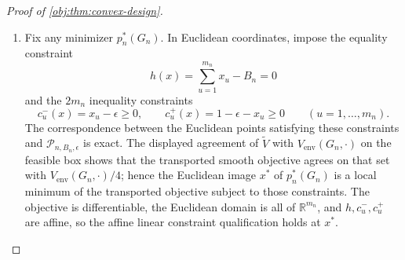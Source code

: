 \documentclass[11pt]{article}
\begin{document}
\begin{proof}[Proof of \cref{obj:thm:convex-design}]
\begin{enumerate}
For a feasible \(p\), a coordinate \(k\), and a shared neighborhood \(S_{ij}\), differentiation along the \(k\)-th coordinate line gives
\[
\left.\frac{d}{dt}\right|_{t=0}
 \prod_{\ell\in S_{ij}}
 \bigl(p_\ell+\mathbf 1\{\ell=k\}t\bigr)^{-1}
=
\begin{cases}
-\left(\prod_{\ell\in S_{ij}}p_\ell^{-1}\right)p_k^{-1},
   &k\in S_{ij},\\
0,&k\notin S_{ij},
\end{cases}
\]
and
\[
\left.\frac{d}{dt}\right|_{t=0}
 \prod_{\ell\in S_{ij}}
 \bigl(1-p_\ell-\mathbf 1\{\ell=k\}t\bigr)^{-1}
=
\begin{cases}
\left(\prod_{\ell\in S_{ij}}(1-p_\ell)^{-1}\right)(1-p_k)^{-1},
   &k\in S_{ij},\\
0,&k\notin S_{ij}.
\end{cases}
\]
When \(k\notin S_{ij}\) the product does not depend on \(t\), and when \(k\in S_{ij}\) only the factor indexed by \(k\) varies, contributing \(\frac{d}{dt}(p_k+t)^{-1}|_{t=0}=-p_k^{-2}\) and \(\frac{d}{dt}(1-p_k-t)^{-1}|_{t=0}=(1-p_k)^{-2}\), respectively.  Subtracting the constant \(1\) leaves these derivatives unchanged, so the same formulas hold for the treated and control overlap loads, including the case \(S_{ij}=\varnothing\), where both derivatives vanish.  Summing over \((i,j)\) and multiplying by \((|O_n|)^{-1}\) gives exactly \cref{obj:def:kkt-gradient}:
\[
\left.\frac{d}{dt}\right|_{t=0}
\frac{V_{\mathrm{env}}\bigl(G_n,p+t e_k\bigr)}{4}
=g_k(G_n,p).
\]
Since \(\epsilon\le p_k\le1-\epsilon\), every \(|t|<\epsilon/2\) keeps \(p+te_k\) in the region where \(\widetilde V\) agrees with \(V_{\mathrm{env}}(G_n,\cdot)\).  Therefore the \(k\)-th Euclidean partial derivative of the transported objective at any feasible \(p\) is \(g_k(G_n,p)\).

\item Fix any minimizer \(p_n^*(G_n)\).  In Euclidean coordinates, impose the equality constraint
\[
h(x)=\sum_{u=1}^{m_n}x_u-B_n=0
\]
and the \(2m_n\) inequality constraints
\[
c_u^-(x)=x_u-\epsilon\ge0,
\qquad
c_u^+(x)=1-\epsilon-x_u\ge0
\qquad(u=1,\ldots,m_n).
\]
The correspondence between the Euclidean points satisfying these constraints and \(\mathcal P_{n,B_n,\epsilon}\) is exact.  The displayed agreement of \(\widetilde V\) with \(V_{\mathrm{env}}(G_n,\cdot)\) on the feasible box shows that the transported smooth objective agrees on that set with \(V_{\mathrm{env}}(G_n,\cdot)/4\); hence the Euclidean image \(x^*\) of \(p_n^*(G_n)\) is a local minimum of the transported objective subject to those constraints.  The objective is differentiable, the Euclidean domain is all of \(\mathbb R^{m_n}\), and \(h,c_u^-,c_u^+\) are affine, so the affine linear constraint qualification holds at \(x^*\).


\end{enumerate}
\end{proof}
\end{document}
